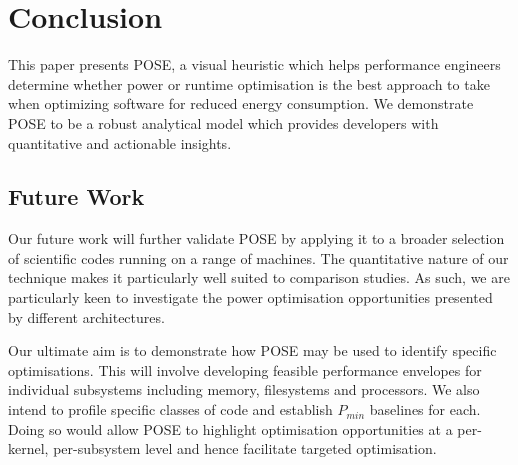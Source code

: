 \section{Conclusion}
\label{sec:conclusion}
This paper presents POSE, a visual heuristic which helps performance engineers determine whether power or runtime optimisation is the best approach to take when optimizing software for reduced energy consumption.
We demonstrate POSE to be a robust analytical model which provides developers with quantitative and actionable insights.

\subsection{Future Work}
Our future work will further validate POSE by applying it to a broader selection of scientific codes running on a range of machines.
The quantitative nature of our technique makes it particularly well suited to comparison studies.
As such, we are particularly keen to investigate the power optimisation opportunities presented by different architectures.

Our ultimate aim is to demonstrate how POSE may be used to identify specific optimisations.
This will involve developing feasible performance envelopes for individual subsystems including memory, filesystems and processors. 
We also intend to profile specific classes of code and establish $P_{min}$ baselines for each.
Doing so would allow POSE to highlight optimisation opportunities at a per-kernel, per-subsystem level and hence facilitate targeted optimisation.
